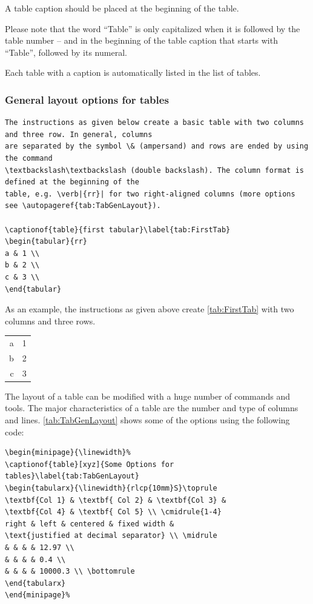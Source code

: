 \documentclass{pharmrep}
\begin{document}
A table caption should be placed at the beginning of the table.

Please note that the word ``Table'' is only capitalized when it is followed by the table number -- and in the
beginning of the table caption that starts with ``Table'', followed by its numeral.

Each table with a caption is automatically listed in the list of tables.

\subsubsection{General layout options for tables}
\begin{verbatim}
The instructions as given below create a basic table with two columns and three row. In general, columns
are separated by the symbol \& (ampersand) and rows are ended by using the command
\textbackslash\textbackslash (double backslash). The column format is defined at the beginning of the
table, e.g. \verb|{rr}| for two right-aligned columns (more options see \autopageref{tab:TabGenLayout}).

\captionof{table}{first tabular}\label{tab:FirstTab}
\begin{tabular}{rr}
a & 1 \\
b & 2 \\
c & 3 \\
\end{tabular}
\end{verbatim}

As an example, the instructions as given above create \autoref{tab:FirstTab} with two columns and three
rows.
\begin{minipage}{\linewidth}
   \label{tab:FirstTab}
   \begin{tabular}{rr}
      a & 1 \\
      b & 2 \\
      c & 3 \\
   \end{tabular}
\end{minipage}

The layout of a table can be modified with a huge number of commands and tools. The major
characteristics of a table are the number and type of columns and lines. \autoref{tab:TabGenLayout}
shows some of the options using the following code:
\begin{verbatim}
\begin{minipage}{\linewidth}%
\captionof{table}[xyz]{Some Options for tables}\label{tab:TabGenLayout}
\begin{tabularx}{\linewidth}{rlcp{10mm}S}\toprule
\textbf{Col 1} & \textbf{ Col 2} & \textbf{Col 3} &
\textbf{Col 4} & \textbf{ Col 5} \\ \cmidrule{1-4}
right & left & centered & fixed width &
\text{justified at decimal separator} \\ \midrule
& & & & 12.97 \\
& & & & 0.4 \\
& & & & 10000.3 \\ \bottomrule
\end{tabularx}
\end{minipage}%
\end{verbatim}
\end{document}
